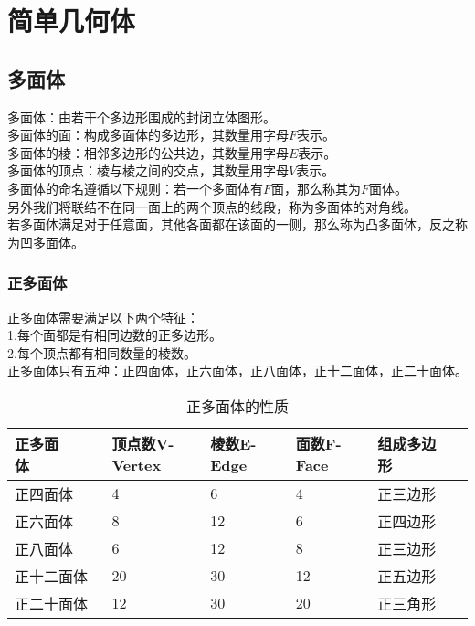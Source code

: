 \documentclass[UTF8]{ctexart}
\begin{document}
\newpage

\section{简单几何体}

\subsection{多面体}
    多面体：由若干个多边形围成的封闭立体图形。\\[3mm]
    多面体的面：构成多面体的多边形，其数量用字母$F$表示。\\[3mm]
    多面体的棱：相邻多边形的公共边，其数量用字母$E$表示。\\[3mm]
    多面体的顶点：棱与棱之间的交点，其数量用字母$V$表示。\\[3mm]
    多面体的命名遵循以下规则：若一个多面体有$F$面，那么称其为$F$面体。\\[3mm]
    另外我们将联结不在同一面上的两个顶点的线段，称为多面体的对角线。\\[3mm]
    若多面体满足对于任意面，其他各面都在该面的一侧，那么称为凸多面体，反之称为凹多面体。

\subsubsection{正多面体}
    正多面体需要满足以下两个特征：\\[3mm]
    1.每个面都是有相同边数的正多边形。\\[3mm]
    2.每个顶点都有相同数量的棱数。\\[5mm]
    正多面体只有五种：正四面体，正六面体，正八面体，正十二面体，正二十面体。\vspace{5pt}
    \begin{table}[h]
        \begin{center}
            \begin{tabular}{l|l|l|l|l}
                \hline
                正多面体~~~~~~~~&顶点数V-Vertex~~~~&棱数E-Edge~~~~&面数F-Face~~~~&组成多边形~~~~~~~~\\ \hline
                正四面体&4&6&4&正三边形\\ \hline
                正六面体&8&12&6&正四边形\\ \hline
                正八面体&6&12&8&正三边形\\ \hline
                正十二面体&20&30&12&正五边形\\ \hline
                正二十面体&12&30&20&正三角形\\ \hline
            \end{tabular}
            \caption{正多面体的性质}
        \end{center}
    \end{table}\vspace{-20pt}
\end{document}
